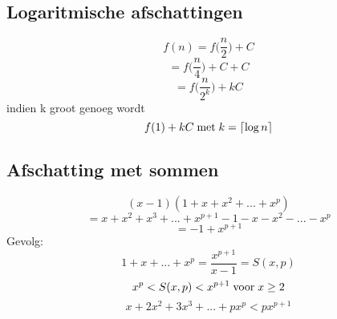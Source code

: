 \documentclass[12pt]{report}
\def\lc{\left\lceil}
\def\rc{\right\rceil}
\begin{document}
\subsection{Logaritmische afschattingen}
$$f(n) = f\bigg(\frac{n}{2}\bigg) + C$$
$$= f\bigg(\frac{n}{4}\bigg) + C + C$$
$$= f\bigg(\frac{n}{2^k}\bigg) + kC$$
indien k groot genoeg wordt
$$f(1) + kC\; \hbox{met}\; k = \lc\log n \rc$$
\subsection{Afschatting met sommen}
$$(x - 1)(1 + x + x^2 + ... + x^p)$$
$$= x + x^2 + x^3 + ... + x^{p + 1} - 1 - x - x^2 - ... - x^p$$
$$= - 1 + x^{p + 1}$$
Gevolg:
$$1 + x + ... + x^p = \frac{x^{p + 1}}{x-1} = S(x, p)$$
$$x^p < S(x, p) < x^{p + 1} \; \hbox{voor}\; x \geq 2$$
$$x + 2x^2 + 3x^3 + ... + px^p < px^{p + 1}$$
\end{document}
